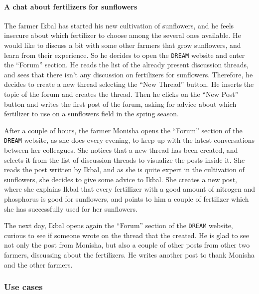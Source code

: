 \documentclass{article}
\begin{document}
\paragraph{A chat about fertilizers for sunflowers}
The farmer Ikbal has started his new cultivation of sunflowers, and he feels insecure about which fertilizer to choose among the several ones available. He would like to discuss a bit with some other farmers that grow sunflowers, and learn from their experience. So he decides to open the \verb|DREAM| website and enter the “Forum” section. He reads the list of the already present discussion threads, and sees that there isn’t any discussion on fertilizers for sunflowers. Therefore, he decides to create a new thread selecting the “New Thread” button. He inserts the topic of the forum and creates the thread. Then he clicks on the “New Post” button and writes the first post of the forum, asking for advice about which fertilizer to use on a sunflowers field in the spring season.\par
\noindent
After a couple of hours, the farmer Monisha opens the “Forum” section of the \verb|DREAM| website, as she does every evening, to keep up with the latest conversations between her colleagues. She notices that a new thread has been created, and selects it from the list of discussion threads to visualize the posts inside it. She reads the post written by Ikbal, and as she is quite expert in the cultivation of sunflowers, she decides to give some advice to Ikbal. She creates a new post, where she explains Ikbal that every fertillizer with a good amount of nitrogen and phosphorus is good for sunflowers, and points to him a couple of fertilizer which she has successfully used for her sunflowers.\par
\noindent
The next day, Ikbal opens again the “Forum” section of the \verb|DREAM| website, curious to see if someone wrote on the thread that the created. He is glad to see not only the post from Monisha, but also a couple of other posts from other two farmers, discussing about the fertilizers. He writes another post to thank Monisha and the other farmers.

\newpage
\subsubsection{Use cases}
\end{document}
